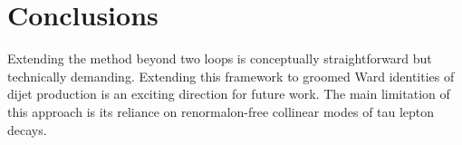 \section{Conclusions}\label{sec:conclusions}

Extending the method beyond two loops is conceptually straightforward
but technically demanding. Extending this framework to groomed Ward
identities of dijet production is an exciting direction for future work.
The main limitation of this approach is its reliance on renormalon-free
collinear modes of tau lepton decays.

